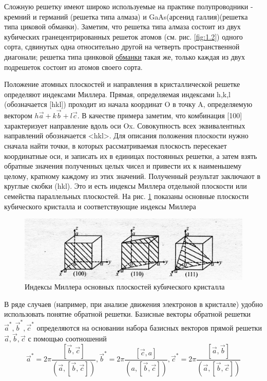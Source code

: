 Сложную решетку имеют широко используемые на практике полупроводники - кремний и германий (решетка типа алмаза) и
GaAs(арсенид галлия)(решетка типа циковой обманки). Заметим, что решетка типа алмаза состоит из двух кубических
гранецентрированных решеток атомов (см. рис. \ref{fig:1.2}) одного сорта, сдвинутых одна относительно другой на четверть
пространственной диагонали; решетка типа цинковой
\href{https://ru.wikipedia.org/wiki/%D0%9E%D0%B1%D0%BC%D0%B0%D0%BD%D0%BA%D0%B8}{обманки} такая же, только каждая из двух
подрешеток состоит из атомов своего сорта.

Положение атомных плоскостей и направления в кристаллической решетке определяют индексами Миллера. Прямая, определяемая
индексами h,k,l (обозначается [hkl]) проходит из начала координат O в точку A, определяемую вектором $h \vec{a} + k
\vec{b} + l \vec{c}$. В качестве примера заметим, что комбинация [100] характеризует направление вдоль оси Ox.
Совокупность всех эквивалентных направлений обозначается <hkl>. Для описания положения плоскости нужно сначала найти точки, в которых рассматриваемая
плоскость пересекает координатные оси, и записать их в единицах постоянных решетки, а затем взять обратные значения
полученных целых чисел и привести их к наименьшему целому, кратному каждому из этих значений. Полученный результат
заключают в круглые скобки (hkl). Это и есть индексы Миллера отдельной плоскости или семейства параллельных плоскостей.
На рис. \ref{fig:1.3} показаны основные плоскости кубического кристалла и соответствующие индексы Миллера

\begin{figure}[h!]
	\centering
	\includegraphics[width = .8\linewidth]{img/13.jpg}
	\caption{Индексы Миллера основных плоскостей кубического кристалла}
	\label{fig:1.3}
\end{figure}

В ряде случаев (например, при анализе движения электронов в кристалле) удобно использовать понятие обратной решетки.
Базисные векторы обратной решетки $\vec{a}^*,\vec{b}^*,\vec{c}^*$ определяются на основании набора базисных векторов
прямой решетки $\vec{a},\vec{b},\vec{c}$ с помощью соотношений
\begin{equation}
	\vec{a}^{*}=2 \pi \frac{[\vec{b}, \vec{c}]}{(\vec{a}, [ \vec{b}, \vec{c}])}, \vec{b}^{*}=2 \pi \frac{[\vec{c}, a]}{(a,[\vec{b}, \vec{c}])}, \vec{c}^{*}=2 \pi \frac{[\vec{a}, \vec{b}]}{(\vec{a},[\vec{b}, \vec{c}])}
	\label{eq:1.2}
\end{equation}

